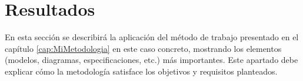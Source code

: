 \chapter{Resultados}
\label{cap:Resultados}

En esta sección se describirá la aplicación del método de trabajo presentado en el capítulo \ref{cap:MiMetodologia} en este caso concreto, mostrando los elementos (modelos, diagramas, especificaciones, etc.) más importantes. Este apartado debe explicar cómo la metodología satisface los objetivos y requisitos planteados.
